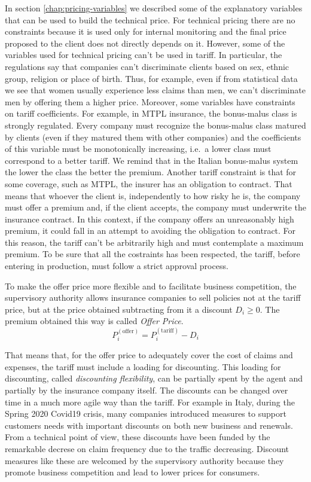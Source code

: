 \documentclass[a4paper, nobind]{templates/ociamthesis}
\theoremstyle{definition}
\theoremstyle{definition}
\theoremstyle{definition}
\theoremstyle{remark}
\begin{document}
In section \ref{chap:pricing-variables} we described some of the explanatory variables that can be used to build the technical price. For technical pricing there are no constraints because it is used only for internal monitoring and the final price proposed to the client does not directly depends on it. However, some of the variables used for technical pricing can't be used in tariff. In particular, the regulations say that companies can't discriminate clients based on sex, ethnic group, religion or place of birth. Thus, for example, even if from statistical data we see that women usually experience less claims than men, we can't discriminate men by offering them a higher price. Moreover, some variables have constraints on tariff coefficients. For example, in MTPL insurance, the bonus-malus class is strongly regulated. Every company must recognize the bonus-malus class matured by clients (even if they matured them with other companies) and the coefficients of this variable must be monotonically increasing, i.e.~a lower class must correspond to a better tariff. We remind that in the Italian bonus-malus system the lower the class the better the premium. Another tariff constraint is that for some coverage, such as MTPL, the insurer has an obligation to contract. That means that whoever the client is, independently to how risky he is, the company must offer a premium and, if the client accepts, the company must underwrite the insurance contract. In this context, if the company offers an unreasonably high premium, it could fall in an attempt to avoiding the obligation to contract. For this reason, the tariff can't be arbitrarily high and must contemplate a maximum premium. To be sure that all the costraints has been respected, the tariff, before entering in production, must follow a strict approval process.

To make the offer price more flexible and to facilitate business competition, the supervisory authority allows insurance companies to sell policies not at the tariff price, but at the price obtained subtracting from it a discount \(D_i\ge0\). The premium obtained this way is called \emph{Offer Price}.
\[
P^{(\text{offer})}_i = P^{(\text{tariff})}_i - D_i
\]

That means that, for the offer price to adequately cover the cost of claims and expenses, the tariff must include a loading for discounting. This loading for discounting, called \emph{discounting flexibility}, can be partially spent by the agent and partially by the insurance company itself. The discounts can be changed over time in a much more agile way than the tariff. For example in Italy, during the Spring 2020 Covid19 crisis, many companies introduced measures to support customers needs with important discounts on both new business and renewals. From a technical point of view, these discounts have been funded by the remarkable decrese on claim frequency due to the traffic decreasing. Discount measures like these are welcomed by the supervisory authority because they promote business competition and lead to lower prices for consumers.
\end{document}
